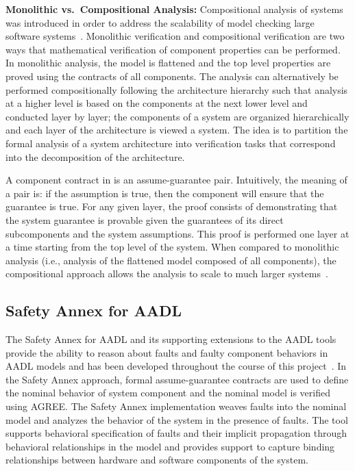 \textbf{Monolithic vs.~Compositional Analysis:} Compositional analysis of systems was introduced in order to address the scalability of model checking large software systems~\cite{pnueli1985transition, heckel1998compositional, NFM2012:CoGaMiWhLaLu}. Monolithic verification and compositional verification are two ways that mathematical verification of component properties can be performed. In monolithic analysis, the model is flattened and the top level properties are proved using the contracts of all components. The analysis can alternatively be performed compositionally following the architecture hierarchy such that analysis at a higher level is based on the components at the next lower level and conducted layer by layer; the components of a system are organized hierarchically and each layer of the architecture is viewed a system. The idea is to partition the formal analysis of a system architecture into verification tasks that correspond into the decomposition of the architecture. 

A component contract in \agree is an assume-guarantee pair. Intuitively, the meaning of a pair is: if the assumption is true, then the component will ensure that the guarantee is true. For any given layer, the proof consists of demonstrating that the system guarantee is provable given the guarantees of its direct subcomponents and the system assumptions. This proof is performed one layer at a time starting from the top level of the system. When compared to monolithic analysis (i.e., analysis of the flattened model composed of all components), the compositional approach allows the analysis to scale to much larger systems~\cite{NFM2012:CoGaMiWhLaLu}. 

\subsection{Safety Annex for AADL}
The Safety Annex for AADL and its supporting extensions to the AADL tools provide the ability to reason about faults and faulty component behaviors in AADL models and has been developed throughout the course of this project~\cite{Stewart17:IMBSA,SATechReport, stewart2020safety, nasaFinalReport}. In the Safety Annex approach, formal assume-guarantee contracts are used to define the nominal behavior of system component and the nominal model is verified using AGREE. The Safety Annex implementation weaves faults into the nominal model and analyzes the behavior of the system in the presence of faults. The tool supports behavioral specification of faults and their implicit propagation through behavioral relationships in the model and provides support to capture binding relationships between hardware and software components of the system.